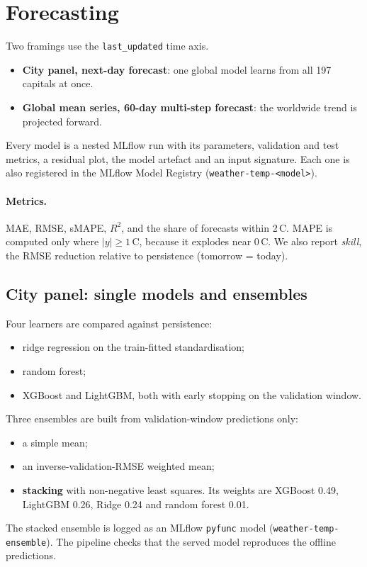 \section{Forecasting}
Two framings use the \texttt{last\_updated} time axis.
\begin{itemize}
  \item \textbf{City panel, next-day forecast}: one global model learns from all 197 capitals at once.
  \item \textbf{Global mean series, 60-day multi-step forecast}: the worldwide trend is projected forward.
\end{itemize}
Every model is a nested MLflow run with its parameters, validation and test metrics, a residual plot, the
model artefact and an input signature. Each one is also registered in the MLflow Model Registry
(\texttt{weather-temp-<model>}).

\paragraph{Metrics.} MAE, RMSE, sMAPE, $R^2$, and the share of forecasts within 2\,\textdegree C.
MAPE is computed only where $|y|\ge1$\,\textdegree C, because it explodes near 0\,\textdegree C. We also
report \emph{skill}, the RMSE reduction relative to persistence (tomorrow = today).

\subsection{City panel: single models and ensembles}
Four learners are compared against persistence:
\begin{itemize}
  \item ridge regression on the train-fitted standardisation;
  \item random forest;
  \item XGBoost and LightGBM, both with early stopping on the validation window.
\end{itemize}
Three ensembles are built from validation-window predictions only:
\begin{itemize}
  \item a simple mean;
  \item an inverse-validation-RMSE weighted mean;
  \item \textbf{stacking} with non-negative least squares. Its weights are XGBoost 0.49, LightGBM 0.26,
        Ridge 0.24 and random forest 0.01.
\end{itemize}
The stacked ensemble is logged as an MLflow \texttt{pyfunc} model (\texttt{weather-temp-ensemble}). The
pipeline checks that the served model reproduces the offline predictions.

